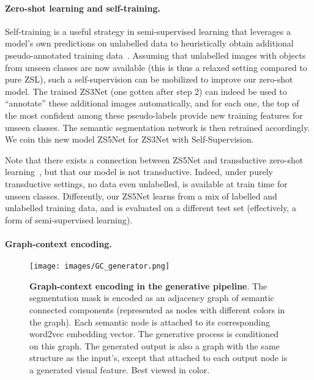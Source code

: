 \documentclass{article}
\begin{document}
\vspace{-0.3cm}
\paragraph{Zero-shot learning and self-training.}

Self-training is a useful strategy in semi-supervised learning that leverages a model's own predictions on unlabelled data to heuristically obtain additional pseudo-annotated training data~\cite{zhu2005semi}.
Assuming that unlabelled images with objects from unseen classes are now available (this is thus a relaxed setting compared to pure ZSL), such a self-supervision can be mobilized to improve our zero-shot model. 
The trained ZS3Net (one gotten after step 2) can indeed be used to ``annotate'' these additional images automatically, and for each one, the top  of the most confident among these pseudo-labels provide new training features for unseen classes. 
The semantic segmentation network is then retrained accordingly.
We coin this new model ZS5Net for ZS3Net with Self-Supervision.


Note that there exists a connection between ZS5Net and transductive zero-shot learning~\cite{li2017zero, song2018transductive, zhang2016zero}, but that our model is not transductive.
Indeed, under purely transductive settings, no data even unlabelled, is available at train time for unseen classes.
Differently, our ZS5Net learns from a mix of labelled and unlabelled training data, and is evaluated on a different test set (effectively, a form of semi-supervised learning).



\vspace{-0.3cm}
\paragraph{Graph-context encoding.} 

\begin{figure}[h]
\centering
\texttt{[image: images/GC\_generator.png]}
\caption{\small \textbf{Graph-context encoding in the generative pipeline}. The segmentation mask is encoded as an adjacency graph of semantic connected components (represented as nodes with different colors in the graph). Each semantic node is attached to its corresponding word2vec embedding vector. The generative process is conditioned on this graph. The generated output is also a graph with the same structure as the input's, except that attached to each output node is a generated visual feature.  Best viewed in color.}
\vspace{-0.3cm}
\label{fig:gc_gen}
\end{figure}
\end{document}
